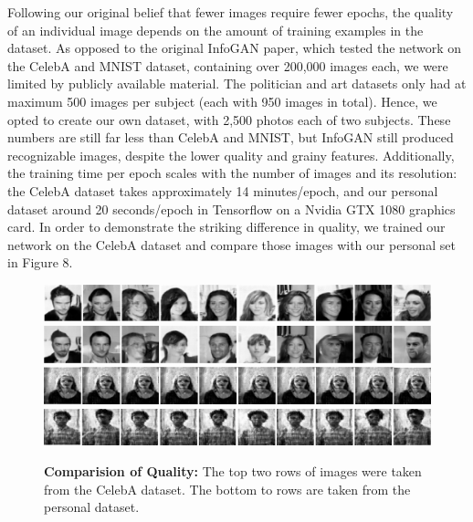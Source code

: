 \documentclass[conference,11pt]{IEEEtran}
\begin{document}
Following our original belief that fewer images require fewer epochs, the quality of an individual image depends on the amount of training examples in the dataset.  As opposed to the original InfoGAN paper, which tested the network on the CelebA and MNIST dataset, containing over 200,000 images each, we were limited by publicly available material.  The politician and art datasets only had at maximum 500 images per subject (each with 950 images in total).  Hence, we opted to create our own dataset, with 2,500 photos each of two subjects.  These numbers are still far less than CelebA and MNIST, but InfoGAN still produced recognizable images, despite the lower quality and grainy features.  Additionally, the training time per epoch scales with the number of images and its resolution: the CelebA dataset takes approximately 14 minutes/epoch, and our personal dataset around 20 seconds/epoch in Tensorflow on a Nvidia GTX 1080 graphics card.  In order to demonstrate the striking difference in quality, we trained our network on the CelebA dataset and compare those images with our personal set in Figure 8.

\begin{figure}[ht]
    \centering
    \includegraphics[width=\linewidth]{pictures/celeba1.png}
    \includegraphics[width=\linewidth]{pictures/celeba2.png}\vspace{2mm}
    \includegraphics[width=\linewidth]{pictures/personal/lilly-ahead-final.jpg}
    \includegraphics[width=\linewidth]{pictures/personal/rasheed-ahead-final.jpg}   
    \caption{\textbf{Comparision of Quality:} The top two rows of images were taken from the CelebA dataset.  The bottom to rows are taken from the personal dataset.}
\end{figure}
\end{document}
